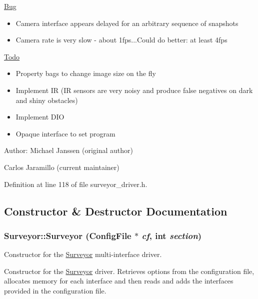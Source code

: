 \begin{Desc}
\item[\hyperlink{bug__bug000001}{Bug}]\begin{itemize}
\item Camera interface appears delayed for an arbitrary sequence of snapshots\item Camera rate is very slow - about 1fps...Could do better: at least 4fps\end{itemize}
\end{Desc}
\begin{Desc}
\item[\hyperlink{todo__todo000001}{Todo}]\begin{itemize}
\item Property bags to change image size on the fly\item Implement IR (IR sensors are very noisy and produce false negatives on dark and shiny obstacles)\item Implement DIO\item Opaque interface to set program\end{itemize}
\end{Desc}
\begin{Desc}
\item[Author:]Michael Janssen (original author) 

Carlos Jaramillo (current maintainer) \end{Desc}


Definition at line 118 of file surveyor\_\-driver.h.

\subsection{Constructor \& Destructor Documentation}
\hypertarget{classSurveyor_b0792137ec4760d15de63856ebeb7464}{
\subsubsection[{Surveyor}]{\setlength{\rightskip}{0pt plus 5cm}Surveyor::Surveyor (ConfigFile $\ast$ {\em cf}, \/  int {\em section})}}
\label{classSurveyor_b0792137ec4760d15de63856ebeb7464}


Constructor for the \hyperlink{classSurveyor}{Surveyor} multi-interface driver. 

Constructor for the \hyperlink{classSurveyor}{Surveyor} driver. Retrieves options from the configuration file, allocates memory for each interface and then reads and adds the interfaces provided in the configuration file.

